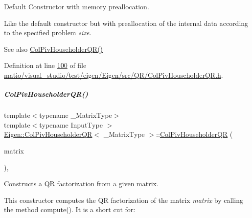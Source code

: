 Default Constructor with memory preallocation. 

Like the default constructor but with preallocation of the internal data according to the specified problem {\itshape size}. \begin{DoxySeeAlso}{See also}
\hyperlink{group___q_r___module_a9d8a92c2a2f0debe5454812372237ed4}{Col\+Piv\+Householder\+Q\+R()} 
\end{DoxySeeAlso}


Definition at line \hyperlink{matio_2visual__studio_2test_2eigen_2_eigen_2src_2_q_r_2_col_piv_householder_q_r_8h_source_l00100}{100} of file \hyperlink{matio_2visual__studio_2test_2eigen_2_eigen_2src_2_q_r_2_col_piv_householder_q_r_8h_source}{matio/visual\+\_\+studio/test/eigen/\+Eigen/src/\+Q\+R/\+Col\+Piv\+Householder\+Q\+R.\+h}.

\mbox{\label{group___q_r___module_a1aa6a5b95380df0ceb224cb833316d4f}} 
\subparagraph{\texorpdfstring{Col\+Piv\+Householder\+Q\+R()}{ColPivHouseholderQR()}\hspace{0.1cm}{\footnotesize\ttfamily [7/8]}}
{\footnotesize\ttfamily template$<$typename \+\_\+\+Matrix\+Type$>$ \\
template$<$typename Input\+Type $>$ \\
\hyperlink{group___q_r___module_class_eigen_1_1_col_piv_householder_q_r}{Eigen\+::\+Col\+Piv\+Householder\+QR}$<$ \+\_\+\+Matrix\+Type $>$\+::\hyperlink{group___q_r___module_class_eigen_1_1_col_piv_householder_q_r}{Col\+Piv\+Householder\+QR} (\begin{DoxyParamCaption}\item[{const \hyperlink{group___core___module_struct_eigen_1_1_eigen_base}{Eigen\+Base}$<$ Input\+Type $>$ \&}]{matrix }\end{DoxyParamCaption})\hspace{0.3cm}{\ttfamily [inline]}, {\ttfamily [explicit]}}



Constructs a QR factorization from a given matrix. 

This constructor computes the QR factorization of the matrix {\itshape matrix} by calling the method compute(). It is a short cut for\+:


